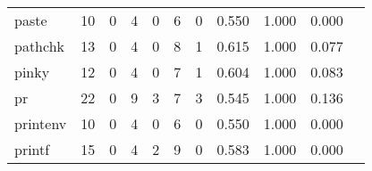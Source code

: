 \begin{longtable}{lp{1.2cm}p{1.2cm}p{1.2cm}p{1.2cm}p{1.2cm}p{1.2cm}p{1.2cm}p{1.2cm}p{1.2cm}p{1.2cm}}
paste     &                                    10 &                                                  0 &                                                  4 &                                                  0 &                                                  6 &                                                  0 &                                         0.550 &                                              1.000 &                                              0.000 \\
pathchk   &                                    13 &                                                  0 &                                                  4 &                                                  0 &                                                  8 &                                                  1 &                                         0.615 &                                              1.000 &                                              0.077 \\
pinky     &                                    12 &                                                  0 &                                                  4 &                                                  0 &                                                  7 &                                                  1 &                                         0.604 &                                              1.000 &                                              0.083 \\
pr        &                                    22 &                                                  0 &                                                  9 &                                                  3 &                                                  7 &                                                  3 &                                         0.545 &                                              1.000 &                                              0.136 \\
printenv  &                                    10 &                                                  0 &                                                  4 &                                                  0 &                                                  6 &                                                  0 &                                         0.550 &                                              1.000 &                                              0.000 \\
printf    &                                    15 &                                                  0 &                                                  4 &                                                  2 &                                                  9 &                                                  0 &                                         0.583 &                                              1.000 &                                              0.000 \\

\end{longtable}
